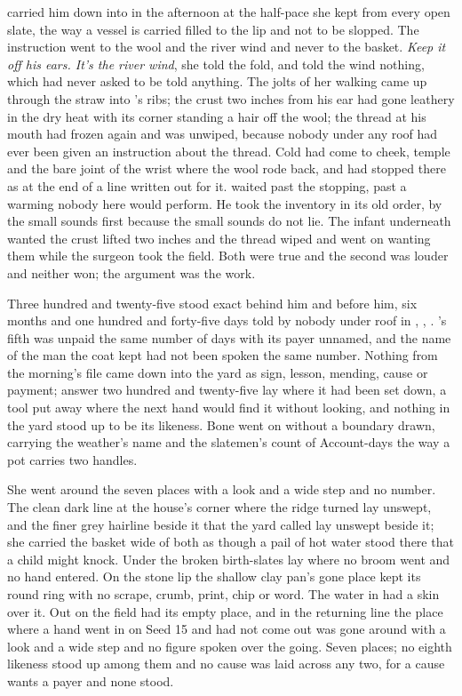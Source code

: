  carried him down into  in the afternoon at the half-pace she kept from every open slate, the way a vessel is carried filled to the lip and not to be slopped. The instruction went to the wool and the river wind and never to the basket. \emph{Keep it off his ears. It's the river wind}, she told the fold, and told the wind nothing, which had never asked to be told anything. The jolts of her walking came up through the straw into 's ribs; the crust two inches from his ear had gone leathery in the dry heat with its corner standing a hair off the wool; the thread at his mouth had frozen again and was unwiped, because nobody under any roof had ever been given an instruction about the thread. Cold had come to cheek, temple and the bare joint of the wrist where the wool rode back, and had stopped there as at the end of a line written out for it.  waited past the stopping, past a warming nobody here would perform. He took the inventory in its old order, by the small sounds first because the small sounds do not lie. The infant underneath wanted the crust lifted two inches and the thread wiped and went on wanting them while the surgeon took the field. Both were true and the second was louder and neither won; the argument was the work.

Three hundred and twenty-five stood exact behind him and before him, six months and one hundred and forty-five days told by nobody under  roof in , , . 's fifth was unpaid the same number of days with its payer unnamed, and the name of the man the coat kept had not been spoken the same number. Nothing from the morning's file came down into the yard as sign, lesson, mending, cause or payment; answer two hundred and twenty-five lay where it had been set down, a tool put away where the next hand would find it without looking, and nothing in the yard stood up to be its likeness. Bone went on without a boundary drawn, carrying the weather's name and the slatemen's count of Account-days the way a pot carries two handles.

She went around the seven places with a look and a wide step and no number. The clean dark line at the house's corner where the  ridge turned lay unswept, and the finer grey hairline beside it that the yard called  lay unswept beside it; she carried the basket wide of both as though a pail of hot water stood there that a child might knock. Under  the broken birth-slates lay where no broom went and no hand entered. On the stone lip the shallow clay pan's gone place kept its round ring with no scrape, crumb, print, chip or word. The water in  had a skin over it. Out on  the field had its empty place, and in the returning line the place where a hand went in on Seed 15 and had not come out was gone around with a look and a wide step and no figure spoken over the going. Seven places; no eighth likeness stood up among them and no cause was laid across any two, for a cause wants a payer and none stood.


